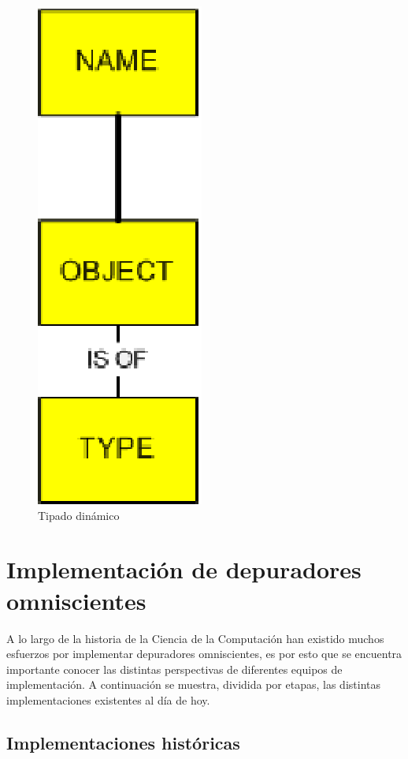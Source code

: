 \documentclass[12pt,legalpaper]{report}
\begin{document}
\begin{figure}[h]
	\centering
	\includegraphics[scale=0.5]{images/JavaPython/dynamicTyping.eps}
	\caption{Tipado dinámico}
\end{figure}


\chapter{Implementación de depuradores omniscientes}

A lo largo de la historia de la Ciencia de la Computación han existido muchos esfuerzos por implementar depuradores omniscientes, es por esto que se encuentra importante conocer las distintas perspectivas de diferentes equipos de implementación.  A continuación se muestra, dividida por etapas, las distintas implementaciones existentes al día de hoy.

	\section{Implementaciones históricas}
\end{document}
